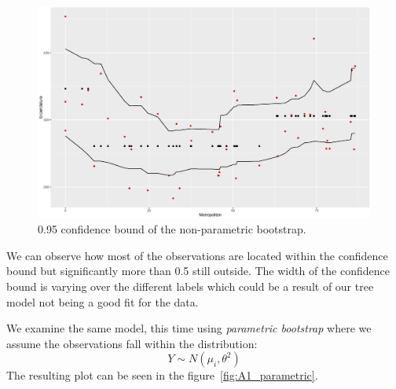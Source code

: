 \documentclass[a4paper,12pt]{article}
\begin{document}
    \begin{figure}[H]
    \centering
    \includegraphics[width=\textwidth]{figures/A1_nonparametric}  
    \caption{0.95 confidence bound of the non-parametric bootstrap. \label{fig:A1_nonparametric}}
    \end{figure}
    We can observe how most of the observations are located within the confidence bound but significantly more than 0.5 still outside. The width of the confidence bound is varying over the different labels which could be a result of our tree model not being a good fit for the data.

    We examine the same model, this time using \textit{parametric bootstrap} where we assume the observations fall within the distribution:
    \begin{equation}
    Y \sim  N(\mu_i,\theta^2)
    \end{equation}
    The resulting plot can be seen in the figure~\ref{fig:A1_parametric}. 
\end{document}
